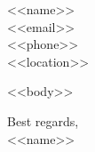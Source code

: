 \documentclass[a4paper,11pt]{article}
\begin{document}
\begin{flushright}
<<name>>\\
<<email>>\\
<<phone>>\\
<<location>>
\end{flushright}

\vspace{10pt}

<<body>>

\vspace{10pt}

Best regards,\\
<<name>>
\end{document}

